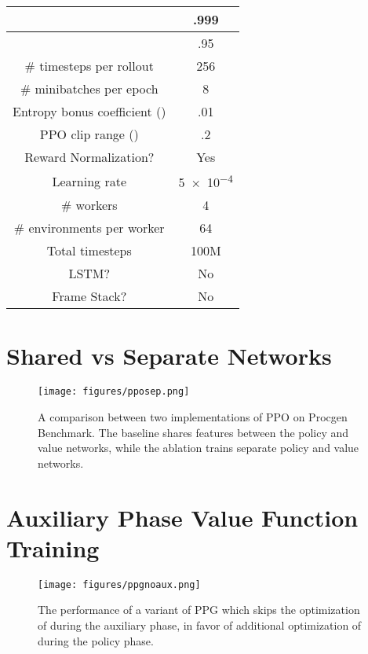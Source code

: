 \documentclass{article}
\begin{document}
\begin{center}
 \begin{tabular}{||c c||} 
 \hline
  & .999 \\ 
 \hline
  & .95 \\
 \hline
 \# timesteps per rollout & 256 \\
 \hline
 \# minibatches per epoch & 8 \\ 
 \hline
 Entropy bonus coefficient () & .01 \\
 \hline
 PPO clip range () & .2 \\
 \hline
 Reward Normalization? & Yes \\
 \hline
 Learning rate & \num{5e-4} \\
 \hline
 \# workers & 4 \\
 \hline
 \# environments per worker & 64 \\ 
 \hline
 Total timesteps & 100M \\
 \hline
 LSTM? & No \\
 \hline
 Frame Stack? & No \\
 \hline
\end{tabular}
\end{center}

\newpage
\section{Shared vs Separate Networks} \label{appendix:separate_networks}

\begin{figure*}[h]
\centering
\texttt{[image: figures/pposep.png]}
\caption{A comparison between two implementations of PPO on Procgen Benchmark. The baseline shares features between the policy and value networks, while the ablation trains separate policy and value networks.}
\label{fig:pposep}
\end{figure*}

\newpage
\section{Auxiliary Phase Value Function Training} \label{appendix:vf_aux_true}

\begin{figure*}[h]
\centering
\texttt{[image: figures/ppgnoaux.png]}
\caption{The performance of a variant of PPG which skips the optimization of  during the auxiliary phase, in favor of additional optimization of  during the policy phase.}
\label{fig:ppgnoaux}
\end{figure*}
\end{document}

